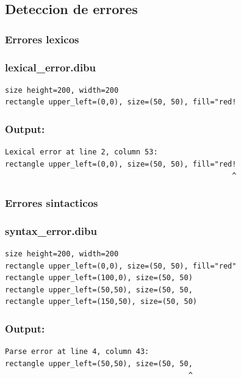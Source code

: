\documentclass{article}
\theoremstyle{definition}
\theoremstyle{remark}
\begin{document}
\subsection{Deteccion de errores}

\subsubsection{Errores lexicos}

\subsubsection*{lexical\_error.dibu}
\begin{verbatim}
size height=200, width=200
rectangle upper_left=(0,0), size=(50, 50), fill="red!
\end{verbatim}

\subsubsection*{Output:}
\begin{verbatim}
Lexical error at line 2, column 53:
rectangle upper_left=(0,0), size=(50, 50), fill="red!
                                                    ^
\end{verbatim}
                 

\subsubsection{Errores sintacticos}

\subsubsection*{syntax\_error.dibu}
\begin{verbatim}
size height=200, width=200
rectangle upper_left=(0,0), size=(50, 50), fill="red"
rectangle upper_left=(100,0), size=(50, 50)
rectangle upper_left=(50,50), size=(50, 50,
rectangle upper_left=(150,50), size=(50, 50)
\end{verbatim}

\subsubsection*{Output:}
\begin{verbatim}
Parse error at line 4, column 43:
rectangle upper_left=(50,50), size=(50, 50,
                                          ^
\end{verbatim}
\end{document}
